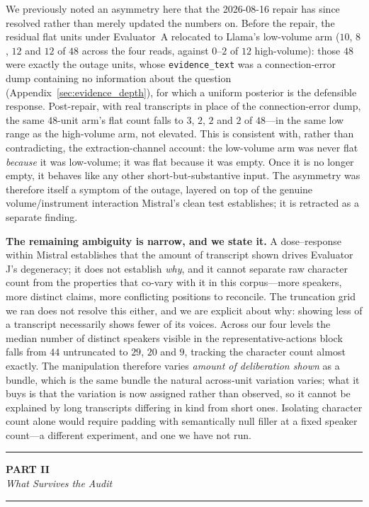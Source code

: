 \documentclass[11pt,journal,onecolumn]{IEEEtran}
\newcommand{\parttitle}[2]{%
  \par\addvspace{1.6\baselineskip}%
  \noindent\rule{\textwidth}{0.9pt}\par\vspace{0.45em}%
  \begin{center}
    {\large\bfseries PART #1}\\[0.3em]
    {\large\itshape #2}
  \end{center}%
  \vspace{0.25em}\noindent\rule{\textwidth}{0.9pt}%
  \par\addvspace{1.1\baselineskip}%
  \nopagebreak}
\begin{document}
We previously noted an asymmetry here that the 2026-08-16 repair has since resolved rather than merely updated the numbers on. Before the repair, the residual flat units under Evaluator~A relocated to Llama's low-volume arm ($10$, $8$, $12$ and $12$ of $48$ across the four reads, against $0$--$2$ of $12$ high-volume): those $48$ were exactly the outage units, whose \texttt{evidence\_text} was a connection-error dump containing no information about the question (Appendix~\ref{sec:evidence_depth}), for which a uniform posterior is the defensible response. Post-repair, with real transcripts in place of the connection-error dump, the same $48$-unit arm's flat count falls to $3$, $2$, $2$ and $2$ of $48$---in the same low range as the high-volume arm, not elevated. This is consistent with, rather than contradicting, the extraction-channel account: the low-volume arm was never flat \emph{because} it was low-volume; it was flat because it was empty. Once it is no longer empty, it behaves like any other short-but-substantive input. The asymmetry was therefore itself a symptom of the outage, layered on top of the genuine volume/instrument interaction Mistral's clean test establishes; it is retracted as a separate finding.

\textbf{The remaining ambiguity is narrow, and we state it.} A dose--response within Mistral establishes that the amount of transcript shown drives Evaluator J's degeneracy; it does not establish \emph{why}, and it cannot separate raw character count from the properties that co-vary with it in this corpus---more speakers, more distinct claims, more conflicting positions to reconcile. The truncation grid we ran does not resolve this either, and we are explicit about why: showing less of a transcript necessarily shows fewer of its voices. Across our four levels the median number of distinct speakers visible in the representative-actions block falls from $44$ untruncated to $29$, $20$ and $9$, tracking the character count almost exactly. The manipulation therefore varies \emph{amount of deliberation shown} as a bundle, which is the same bundle the natural across-unit variation varies; what it buys is that the variation is now assigned rather than observed, so it cannot be explained by long transcripts differing in kind from short ones. Isolating character count alone would require padding with semantically null filler at a fixed speaker count---a different experiment, and one we have not run.

\parttitle{II}{What Survives the Audit}
\end{document}
